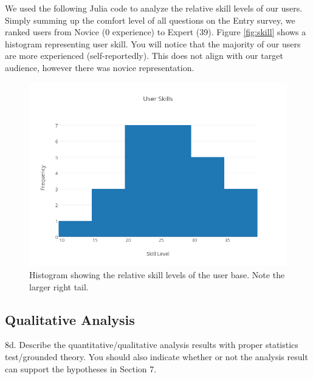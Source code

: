 We used the following Julia code to analyze the relative skill levels of our
users. Simply summing up the comfort level of all questions on the Entry survey,
we ranked users from Novice (0 experience) to Expert (39). Figure
\ref{fig:skill} shows a histogram representing user skill. You will notice that
the majority of our users are more experienced (self-reportedly). This does not
align with our target audience, however there was novice representation.
\begin{figure}[ht]
  \centering
  \includegraphics[width=0.8\linewidth]{figures/stats/user-skills.png}
  \caption{\label{fig:Skill} Histogram showing the relative skill levels of the
    user base. Note the larger right tail. }
\end{figure}


\subsection{Qualitative Analysis}
    8d. Describe the quantitative/qualitative analysis results with proper
    statistics test/grounded theory. You should also indicate whether or not the
    analysis result can support the hypotheses in Section 7.

